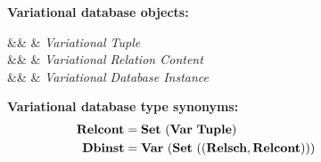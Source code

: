 \begin{figure}
%
\textbf{Variational database objects:}
\begin{syntax}
%
\synDef \vTuple {\vartype \tupletype} &\eqq&  & \textit{Variational Tuple}\\
\synDef \vRelCont \vRelContSet &\eqq& \setDef {\vi \vTuple \numTuples} & \textit{Variational Relation Content}\\
\synDef \vdbInst \vdbInstSet &\eqq& \annot [\dimMeta] {\setDef {\vi \vTab \numRels} } & \textit{Variational Database Instance}
\end{syntax}

\medskip
\textbf{Variational database type synonyms:}
\begin{alignat*}{1}
\vRelContSet &= \settype {(\vartype \tupletype)}\\
\vdbInstSet &= \vartype {\left( \settype {\left(\left(\relschtype,\relconttype\right)\right)}\right)}
\end{alignat*}


\end{figure}
